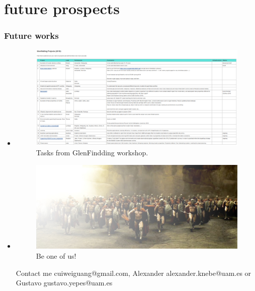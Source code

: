 \documentclass[aspectratio=43]{beamer}
\begin{document}
\section{future prospects}\label{lastpage}
\begin{frame}
  \frametitle{Future works}
  \begin{itemize}
    \item<1|only@1>[]{
    \begin{figure}
      \includegraphics[width=\linewidth]{Tasks18}
      \caption{Tasks from GlenFindding workshop.}
    \end{figure}}
    \item<2|only@2>[]{
      \begin{figure}
        \includegraphics[width=\linewidth]{The300}
        \caption{Be one of us!}
      \end{figure}
      Contact me \alert{cuiweiguang@gmail.com}, Alexander \alert{alexander.knebe@uam.es} or Gustavo \alert{gustavo.yepes@uam.es}}
  \end{itemize}

\end{frame}
\end{document}
